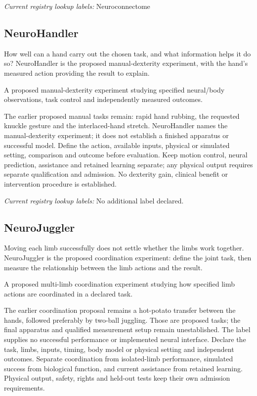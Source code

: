 \noindent\textit{Current registry lookup labels:} Neuroconnectome\par

\subsection*{NeuroHandler}
\noindent How well can a hand carry out the chosen task, and what information helps it do so? NeuroHandler is the proposed manual-dexterity experiment, with the hand’s measured action providing the result to explain.\par
\noindent A proposed manual-dexterity experiment studying specified neural/body observations, task control and independently measured outcomes.\par
\noindent The earlier proposed manual tasks remain: rapid hand rubbing, the requested knuckle gesture and the interlaced-hand stretch. NeuroHandler names the manual-dexterity experiment; it does not establish a finished apparatus or successful model. Define the action, available inputs, physical or simulated setting, comparison and outcome before evaluation. Keep motion control, neural prediction, assistance and retained learning separate; any physical output requires separate qualification and admission. No dexterity gain, clinical benefit or intervention procedure is established.\par


\noindent\textit{Current registry lookup labels:} No additional label declared.\par

\subsection*{NeuroJuggler}
\noindent Moving each limb successfully does not settle whether the limbs work together. NeuroJuggler is the proposed coordination experiment: define the joint task, then measure the relationship between the limb actions and the result.\par
\noindent A proposed multi-limb coordination experiment studying how specified limb actions are coordinated in a declared task.\par
\noindent The earlier coordination proposal remains a hot-potato transfer between the hands, followed preferably by two-ball juggling. Those are proposed tasks; the final apparatus and qualified measurement setup remain unestablished. The label supplies no successful performance or implemented neural interface. Declare the task, limbs, inputs, timing, body model or physical setting and independent outcomes. Separate coordination from isolated-limb performance, simulated success from biological function, and current assistance from retained learning. Physical output, safety, rights and held-out tests keep their own admission requirements.\par


